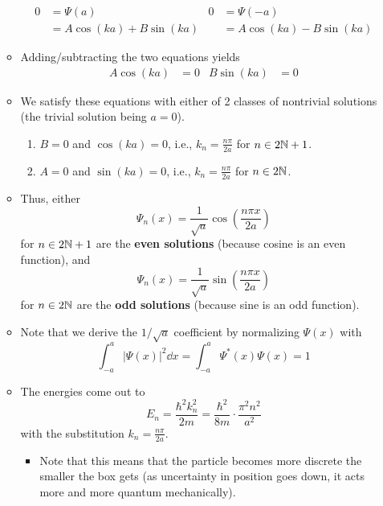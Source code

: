 \documentclass[../notes.tex]{subfiles}
\begin{document}
\begin{itemize}
\begin{itemize}
        \begin{align*}
            0 &= \Psi(a)&
                0 &= \Psi(-a)\\
            &= A\cos(ka)+B\sin(ka)&
                &= A\cos(ka)-B\sin(ka)
        \end{align*}
        \item Adding/subtracting the two equations yields
        \begin{align*}
            A\cos(ka) &= 0&
            B\sin(ka) &= 0
        \end{align*}
        \item We satisfy these equations with either of 2 classes of nontrivial solutions (the trivial solution being $a=0$).
        \begin{enumerate}
            \item $B=0$ and $\cos(ka)=0$, i.e., $k_n=\frac{n\pi}{2a}$ for $n\in 2\mathbb{N}+1$.
            \item $A=0$ and $\sin(ka)=0$, i.e., $k_n=\frac{n\pi}{2a}$ for $n\in 2\mathbb{N}$.
        \end{enumerate}
        \item Thus, either
        \begin{equation*}
            \Psi_n(x) = \frac{1}{\sqrt{a}}\cos\left( \frac{n\pi x}{2a} \right)
        \end{equation*}
        for $n\in 2\mathbb{N}+1$ are the \textbf{even solutions} (because cosine is an even function), and
        \begin{equation*}
            \Psi_n(x) = \frac{1}{\sqrt{a}}\sin\left( \frac{n\pi x}{2a} \right)
        \end{equation*}
        for $n\in 2\mathbb{N}$ are the \textbf{odd solutions} (because sine is an odd function).
        \item Note that we derive the $1/\sqrt{a}$ coefficient by normalizing $\Psi(x)$ with
        \begin{equation*}
            \int_{-a}^a|\Psi(x)|^2\dd{x} = \int_{-a}^a\Psi^*(x)\Psi(x) = 1
        \end{equation*}
        \item The energies come out to
        \begin{equation*}
            E_n = \frac{\hbar^2k_n^2}{2m} = \frac{\hbar^2}{8m}\cdot\frac{\pi^2n^2}{a^2}
        \end{equation*}
        with the substitution $k_n=\frac{n\pi}{2a}$.
        \begin{itemize}
            \item Note that this means that the particle becomes more discrete the smaller the box gets (as uncertainty in position goes down, it acts more and more quantum mechanically).
        \end{itemize}
    \end{itemize}
\end{itemize}
\end{document}
